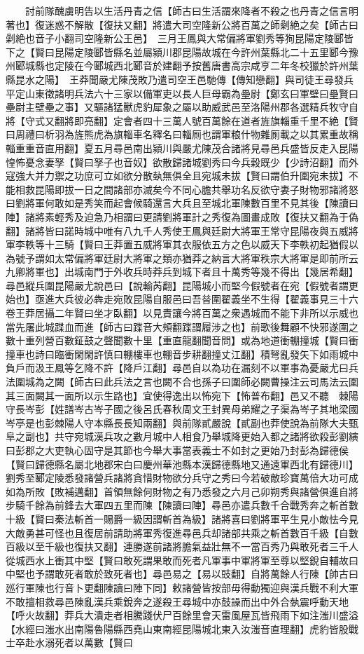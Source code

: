 　　討前隊醜虜明告以生活丹青之信【師古曰生活謂來降者不殺之也丹青之信言明著也】復迷惑不解散【復扶又翻】將遣大司空隆新公將百萬之師劋絶之矣【師古曰劋絶也音子小翻司空隆新公王邑】　三月王鳳與大常偏將軍劉秀等狥昆陽定陵郾皆下之【賢曰昆陽定陵郾皆縣名並屬潁川郡昆陽故城在今許州葉縣北二十五里郾今豫州郾城縣也定陵在今郾城西北郾音於建翻予按舊唐書高宗咸亨二年冬校獵於許州葉縣昆水之陽】　王莽聞嚴尤陳茂敗乃遣司空王邑馳傳【傳知戀翻】與司徒王尋發兵平定山東徵諸明兵法六十三家以備軍吏以長人巨母霸為壘尉【鄭玄曰軍壁曰壘賢曰壘尉主壁壘之事】又驅諸猛獸虎豹犀象之屬以助威武邑至洛陽州郡各選精兵牧守自將【守式又翻將即亮翻】定會者四十三萬人號百萬餘在道者旌旗輜重千里不絶【賢曰周禮曰析羽為旌熊虎為旗輜車名釋名曰輜厠也謂軍粮什物雜厠載之以其累重故稱輜重重音直用翻】夏五月尋邑南出潁川與嚴尤陳茂合諸將見尋邑兵盛皆反走入昆陽惶怖憂念妻孥【賢曰孥子也音奴】欲散歸諸城劉秀曰今兵穀既少【少詩沼翻】而外寇強大并力禦之功庶可立如欲分散埶無俱全且宛城未拔【賢曰謂伯升圍宛未拔】不能相救昆陽即拔一日之間諸部亦滅矣今不同心膽共舉功名反欲守妻子財物邪諸將怒曰劉將軍何敢如是秀笑而起會候騎還言大兵且至城北軍陳數百里不見其後【陳讀曰陣】諸將素輕秀及迫急乃相謂曰更請劉將軍計之秀復為圖畫成敗【復扶又翻為于偽翻】諸將皆曰諾時城中唯有八九千人秀使王鳳與廷尉大將軍王常守昆陽夜與五威將軍李軼等十三騎【賢曰王莽置五威將軍其衣服依五方之色以威天下李軼初起猶假以為號予謂如太常偏將軍廷尉大將軍之類亦猶莽之納言大將軍秩宗大將軍是即前所云九卿將軍也】出城南門于外收兵時莽兵到城下者且十萬秀等幾不得出【幾居希翻】尋邑縱兵圍昆陽嚴尤說邑曰【說輸芮翻】昆陽城小而堅今假號者在宛【假號者謂更始也】亟進大兵彼必犇走宛敗昆陽自服邑曰吾㫺圍翟義坐不生得【翟義事見三十六卷王莽居攝二年賢曰坐才臥翻】以見責讓今將百萬之衆遇城而不能下非所以示威也當先屠此城蹀血而進【師古曰蹀音大頰翻蹀謂履涉之也】前歌後舞顧不快邪遂圍之數十重列營百數鉦鼓之聲聞數十里【重直龍翻聞音問】或為地道衝輣撞城【賢曰衝撞車也詩曰臨衝閑閑許慎曰輣樓車也輣音步耕翻撞丈江翻】積弩亂發矢下如雨城中負戶而汲王鳳等乞降不許【降戶江翻】尋邑自以為功在漏刻不以軍事為憂嚴尤曰兵法圍城為之闕【師古曰此兵法之言也闕不合也孫子曰圍師必闕曹操注云司馬法云圍其三面闕其一面所以示生路也】宜使得逸出以怖宛下【怖普布翻】邑又不聽　棘陽守長岑彭【姓譜岑古岑子國之後呂氏春秋周文王封異母弟耀之子渠為岑子其地梁國岑亭是也彭棘陽人守本縣長長知兩翻】與前隊貳嚴說【貳副也莽使說為前隊大夫甄阜之副也】共守宛城漢兵攻之數月城中人相食乃舉城降更始入都之諸將欲殺彭劉縯曰彭郡之大吏執心固守是其節也今舉大事當表義士不如封之更始乃封彭為歸德侯【賢曰歸德縣名屬北地郡宋白曰慶州華池縣本漢歸德縣地又通遠軍西北有歸德川】　劉秀至郾定陵悉發諸營兵諸將貪惜財物欲分兵守之秀曰今若破敵珍寶萬倍大功可成如為所敗【敗補邁翻】首領無餘何財物之有乃悉發之六月己卯朔秀與諸營俱進自將步騎千餘為前鋒去大軍四五里而陳【陳讀曰陣】尋邑亦遣兵數千合戰秀奔之斬首數十級【賢曰秦法斬首一賜爵一級因謂斬首為級】諸將喜曰劉將軍平生見小敵怯今見大敵勇甚可怪也且復居前請助將軍秀復進尋邑兵却諸部共乘之斬首數百千級【自數百級以至千級也復扶又翻】連勝遂前諸將膽氣益壯無不一當百秀乃與敢死者三千人從城西水上衝其中堅【賢曰敢死謂果敢而死者凡軍事中軍將軍至尊以堅銳自輔故曰中堅也予謂敢死者敢於致死者也】尋邑易之【易以豉翻】自將萬餘人行陳【帥古曰廵行軍陳也行音卜更翻陳讀曰陣下同】敕諸營皆按部毋得動獨迎與漢兵戰不利大軍不敢擅相救尋邑陳亂漢兵乘銳奔之遂殺王尋城中亦鼓譟而出中外合埶震呼動天地【呼火故翻】莽兵大潰走者相騰踐伏尸百餘里會天雷風屋瓦皆飛雨下如注滍川盛溢【水經曰滍水出南陽魯陽縣西堯山東南經昆陽城北東入汝滍音直理翻】虎豹皆股戰士卒赴水溺死者以萬數【賢曰